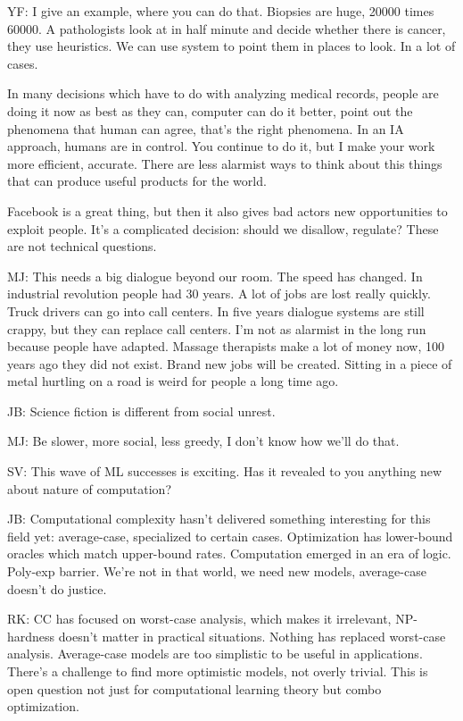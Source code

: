 YF: I give an example, where you can do that.  Biopsies are huge, 20000 times 60000. A pathologists look at in half minute and decide whether there is cancer, they use heuristics. We can use system to point them in places to look. In a lot of cases. 

In many decisions which have to do with analyzing medical records, people are doing it now as best as they can, computer can do it better, point out the phenomena that human can agree, that's the right phenomena. In an IA approach, humans are in control. You continue to do it, but I make your work more efficient, accurate. There are less alarmist ways to think about this things that can produce useful products for the world.

Facebook is a great thing, but then it also gives bad actors new opportunities to exploit people. It's a complicated decision: should we disallow, regulate? These are not technical questions.

MJ: This needs a big dialogue beyond our room. The speed has changed. In industrial revolution people had 30 years. A lot of jobs are lost really quickly. Truck drivers can go into call centers. In five years dialogue systems are still crappy, but they can replace call centers. I'm not as alarmist in the long run because people have adapted. Massage therapists make a lot of money now, 100 years ago they did not exist. Brand new jobs will be created. Sitting in a piece of metal hurtling on a road is weird for people a long time ago. 

JB: Science fiction is different from social unrest. 

MJ: Be slower, more social, less greedy, I don't know how we'll do that.

SV: This wave of ML successes is exciting. Has it revealed to you anything new about nature of computation?

JB: Computational complexity hasn't delivered something interesting for this field yet: average-case, specialized to certain cases. Optimization has lower-bound oracles which match upper-bound rates. Computation emerged in an era of logic. Poly-exp barrier. We're not in that world, we need new models, average-case doesn't do justice. 

RK: CC has focused on worst-case analysis, which makes it irrelevant, NP-hardness doesn't matter in practical situations. Nothing has replaced worst-case analysis. Average-case models are too simplistic to be useful in applications. There's a challenge to find more optimistic models, not overly trivial. This is open question not just for computational learning theory but combo optimization.

